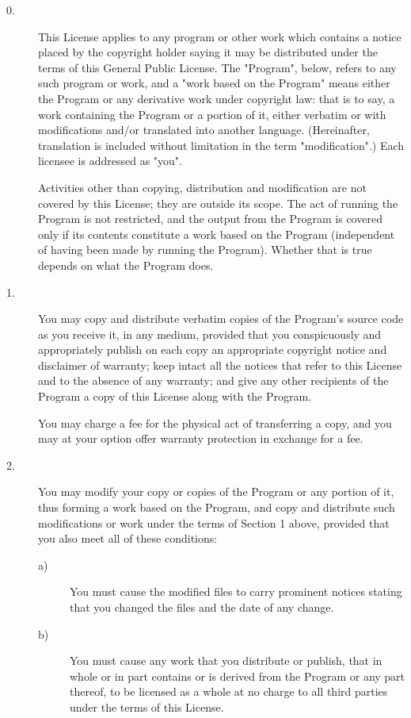 \begin{description}
\item[0.] 
This License applies to any program or other work which contains a
notice placed by the copyright holder saying it may be distributed
under the terms of this General Public License.  The "Program", below,
refers to any such program or work, and a "work based on the Program"
means either the Program or any derivative work under copyright law:
that is to say, a work containing the Program or a portion of it,
either verbatim or with modifications and/or translated into another
language.  (Hereinafter, translation is included without limitation in
the term "modification".)  Each licensee is addressed as "you".

Activities other than copying, distribution and modification are not
covered by this License; they are outside its scope.  The act of
running the Program is not restricted, and the output from the Program
is covered only if its contents constitute a work based on the Program
(independent of having been made by running the Program).  Whether
that is true depends on what the Program does.

\item[1.] You may  copy and  distribute  verbatim  copies of the  Program's
source code as you receive it, in any medium, provided that you
conspicuously and appropriately publish on each copy an appropriate
copyright notice and disclaimer of warranty; keep intact all the
notices that refer to this License and to the absence of any warranty;
and give any other recipients of the Program a copy of this License
along with the Program.

You may charge a fee for the physical act of transferring a copy, and
you may at your option offer warranty protection in exchange for a
fee.

\item[2.] You may modify your copy or copies of the  Program or any portion
of it, thus forming a work based on the Program, and copy and
distribute such modifications or work under the terms of Section 1
above, provided that you also meet all of these conditions:


\begin{description}
\item[a)] You  must cause the modified files  to  carry prominent notices
stating that you changed the files and the date of any change.

\item[b)] You must cause any work that you distribute or publish, that in
whole or in part contains or is derived from the Program or any part
thereof, to be licensed as a whole at no charge to all third parties
under the terms of this License.


\end{description}
\end{description}

